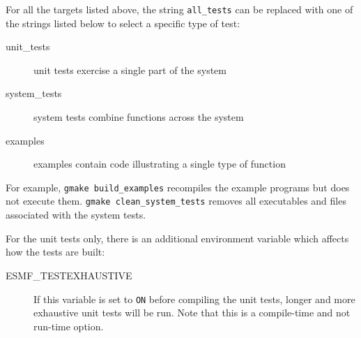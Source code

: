 For all the targets listed above, the string {\tt all\_tests} can be
replaced with one of the strings listed below to select a
specific type of test:
\begin{description}
\item[unit\_tests] unit tests exercise a single part of the system
\item[system\_tests] system tests combine functions across the system
\item[examples] examples contain code illustrating a single type of function
\end{description}
For example, {\tt gmake build\_examples} recompiles the example programs but 
does not execute them.  {\tt gmake clean\_system\_tests} removes all
executables and files associated with the system tests.

For the unit tests only, there is an additional environment variable
which affects how the tests are built:
\begin{description}
\item[ESMF\_TESTEXHAUSTIVE]
If this variable is set to {\tt ON} before compiling the unit tests,
longer and more exhaustive unit tests will be run.  Note that this is a
compile-time and not run-time option.
\end{description}

